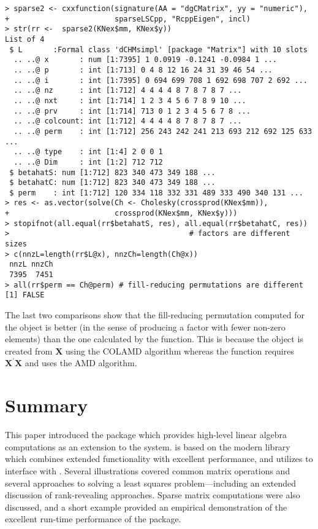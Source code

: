 \documentclass[shortnames,article]{jss}
\begin{document}
\begin{verbatim}
> sparse2 <- cxxfunction(signature(AA = "dgCMatrix", yy = "numeric"),
+                        sparseLSCpp, "RcppEigen", incl)
> str(rr <-  sparse2(KNex$mm, KNex$y))
List of 4
 $ L       :Formal class 'dCHMsimpl' [package "Matrix"] with 10 slots
  .. ..@ x       : num [1:7395] 1 0.0919 -0.1241 -0.0984 1 ...
  .. ..@ p       : int [1:713] 0 4 8 12 16 24 31 39 46 54 ...
  .. ..@ i       : int [1:7395] 0 694 699 708 1 692 698 707 2 692 ...
  .. ..@ nz      : int [1:712] 4 4 4 4 8 7 8 7 8 7 ...
  .. ..@ nxt     : int [1:714] 1 2 3 4 5 6 7 8 9 10 ...
  .. ..@ prv     : int [1:714] 713 0 1 2 3 4 5 6 7 8 ...
  .. ..@ colcount: int [1:712] 4 4 4 4 8 7 8 7 8 7 ...
  .. ..@ perm    : int [1:712] 256 243 242 241 213 693 212 692 125 633 ...
  .. ..@ type    : int [1:4] 2 0 0 1
  .. ..@ Dim     : int [1:2] 712 712
 $ betahatS: num [1:712] 823 340 473 349 188 ...
 $ betahatC: num [1:712] 823 340 473 349 188 ...
 $ perm    : int [1:712] 120 334 118 332 331 489 333 490 340 131 ...
> res <- as.vector(solve(Ch <- Cholesky(crossprod(KNex$mm)),
+                        crossprod(KNex$mm, KNex$y)))
> stopifnot(all.equal(rr$betahatS, res), all.equal(rr$betahatC, res))
>                                         # factors are different sizes
> c(nnzL=length(rr$L@x), nnzCh=length(Ch@x)) 
 nnzL nnzCh 
 7395  7451 
> all(rr$perm == Ch@perm) # fill-reducing permutations are different
[1] FALSE
\end{verbatim}

The last two comparisons show that the fill-reducing permutation
computed for the  object is better (in the sense of
producing a factor with fewer non-zero elements) than the one
calculated by the  function.  This is because
the  object is created from
$\bm X$ using the COLAMD algorithm whereas the 
function requires $\bm X^\prime\bm X$ and uses the AMD algorithm.


\section{Summary}

This paper introduced the  package which provides
high-level linear algebra computations as an extension to the
 system.   is based on the modern
 library  which combines extended
functionality with excellent performance, and utilizes  to
interface  with .  Several illustrations
covered common matrix operations and several approaches to solving a
least squares problem---including an extended discussion of
rank-revealing approaches. Sparse matrix computations were also
discussed, and a short example provided an empirical demonstration of
the excellent run-time performance of the  package.


\end{document}
